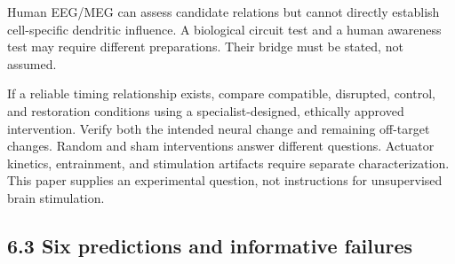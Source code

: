 \documentclass[
  american,
  11pt,
  letterpaper,
]{article}
\begin{document}
Human EEG/MEG can assess candidate relations but cannot directly establish cell-specific dendritic influence. A biological circuit test and a human awareness test may require different preparations. Their bridge must be stated, not assumed.

If a reliable timing relationship exists, compare compatible, disrupted, control, and restoration conditions using a specialist-designed, ethically approved intervention. Verify both the intended neural change and remaining off-target changes. Random and sham interventions answer different questions. Actuator kinetics, entrainment, and stimulation artifacts require separate characterization. This paper supplies an experimental question, not instructions for unsupervised brain stimulation.

\par\ifdim\dimexpr\pagegoal-\pagetotal\relax<120pt\newpage\fi
\subsection{6.3 Six predictions and informative failures}\label{six-predictions-and-informative-failures}
\end{document}
